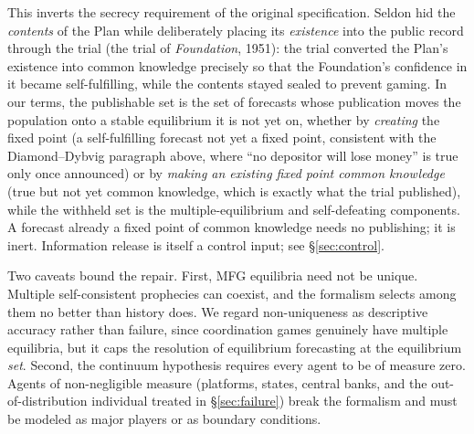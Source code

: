 \documentclass[11pt]{article}
\begin{document}
This inverts the secrecy requirement of the original specification. Seldon hid the \emph{contents} of the Plan while deliberately placing its \emph{existence} into the public record through the trial (the trial of \emph{Foundation}, 1951): the trial converted the Plan's existence into common knowledge precisely so that the Foundation's confidence in it became self-fulfilling, while the contents stayed sealed to prevent gaming. In our terms, the publishable set is the set of forecasts whose publication moves the population onto a stable equilibrium it is not yet on, whether by \emph{creating} the fixed point (a self-fulfilling forecast not yet a fixed point, consistent with the Diamond--Dybvig paragraph above, where ``no depositor will lose money'' is true only once announced) or by \emph{making an existing fixed point common knowledge} (true but not yet common knowledge, which is exactly what the trial published), while the withheld set is the multiple-equilibrium and self-defeating components. A forecast already a fixed point of common knowledge needs no publishing; it is inert. Information release is itself a control input; see \S\ref{sec:control}.

Two caveats bound the repair. First, MFG equilibria need not be unique. Multiple self-consistent prophecies can coexist, and the formalism selects among them no better than history does. We regard non-uniqueness as descriptive accuracy rather than failure, since coordination games genuinely have multiple equilibria, but it caps the resolution of equilibrium forecasting at the equilibrium \emph{set}. Second, the continuum hypothesis requires every agent to be of measure zero. Agents of non-negligible measure (platforms, states, central banks, and the out-of-distribution individual treated in \S\ref{sec:failure}) break the formalism and must be modeled as major players or as boundary conditions.
\end{document}
